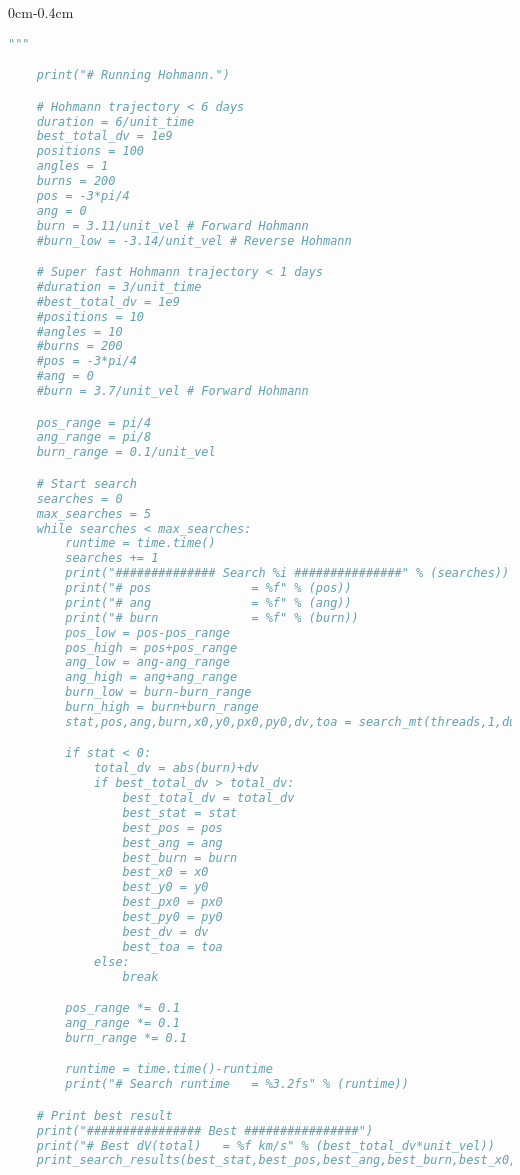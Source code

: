 \begin{adjustwidth*}{0cm}{-0.4cm}
\begin{lstlisting}[language=Python]
    """

    print("# Running Hohmann.")

    # Hohmann trajectory < 6 days
    duration = 6/unit_time
    best_total_dv = 1e9
    positions = 100
    angles = 1
    burns = 200
    pos = -3*pi/4
    ang = 0
    burn = 3.11/unit_vel # Forward Hohmann
    #burn_low = -3.14/unit_vel # Reverse Hohmann

    # Super fast Hohmann trajectory < 1 days
    #duration = 3/unit_time
    #best_total_dv = 1e9
    #positions = 10
    #angles = 10
    #burns = 200
    #pos = -3*pi/4
    #ang = 0
    #burn = 3.7/unit_vel # Forward Hohmann

    pos_range = pi/4
    ang_range = pi/8
    burn_range = 0.1/unit_vel

    # Start search
    searches = 0
    max_searches = 5
    while searches < max_searches:
        runtime = time.time()
        searches += 1
        print("############## Search %i ###############" % (searches))
        print("# pos              = %f" % (pos))
        print("# ang              = %f" % (ang))
        print("# burn             = %f" % (burn))
        pos_low = pos-pos_range
        pos_high = pos+pos_range
        ang_low = ang-ang_range
        ang_high = ang+ang_range
        burn_low = burn-burn_range
        burn_high = burn+burn_range
        stat,pos,ang,burn,x0,y0,px0,py0,dv,toa = search_mt(threads,1,duration,positions,angles,burns,pos_low,pos_high,ang_low,ang_high,burn_low,burn_high)

        if stat < 0:
            total_dv = abs(burn)+dv
            if best_total_dv > total_dv:
                best_total_dv = total_dv
                best_stat = stat
                best_pos = pos
                best_ang = ang
                best_burn = burn
                best_x0 = x0
                best_y0 = y0
                best_px0 = px0
                best_py0 = py0
                best_dv = dv
                best_toa = toa
            else:
                break

        pos_range *= 0.1
        ang_range *= 0.1
        burn_range *= 0.1

        runtime = time.time()-runtime
        print("# Search runtime   = %3.2fs" % (runtime))

    # Print best result
    print("################ Best ################")
    print("# Best dV(total)   = %f km/s" % (best_total_dv*unit_vel))
    print_search_results(best_stat,best_pos,best_ang,best_burn,best_x0,best_y0,best_px0,best_py0,best_dv,best_toa)


\end{lstlisting}
\end{adjustwidth*}
